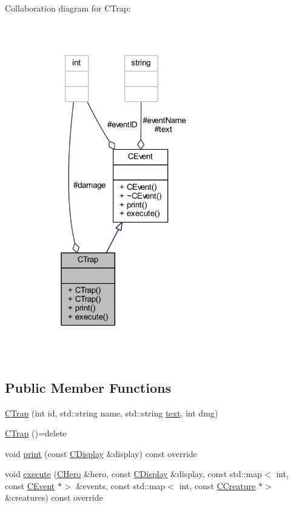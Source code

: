 Collaboration diagram for C\+Trap\+:\nopagebreak
\begin{figure}[H]
\begin{center}
\leavevmode
\includegraphics[width=235pt]{class_c_trap__coll__graph}
\end{center}
\end{figure}
\subsection*{Public Member Functions}
\begin{DoxyCompactItemize}
\item 
\mbox{\hyperlink{class_c_trap_a25c6fff676697227814dd5fb5bfc6b9f}{C\+Trap}} (int id, std\+::string name, std\+::string \mbox{\hyperlink{class_c_event_a0126916c81d39bf5a4bcd18da90b7c61}{text}}, int dmg)
\item 
\mbox{\hyperlink{class_c_trap_ae87432a113f52437d8f686f53fa0a36c}{C\+Trap}} ()=delete
\item 
void \mbox{\hyperlink{class_c_trap_a64aba41bb1f7578d10e347358273acf4}{print}} (const \mbox{\hyperlink{class_c_display}{C\+Display}} \&display) const override
\item 
void \mbox{\hyperlink{class_c_trap_a0b0925310ffbfa28f877ac5669f8bb20}{execute}} (\mbox{\hyperlink{class_c_hero}{C\+Hero}} \&hero, const \mbox{\hyperlink{class_c_display}{C\+Display}} \&display, const std\+::map$<$ int, const \mbox{\hyperlink{class_c_event}{C\+Event}} $\ast$$>$ \&events, const std\+::map$<$ int, const \mbox{\hyperlink{class_c_creature}{C\+Creature}} $\ast$$>$ \&creatures) const override
\end{DoxyCompactItemize}
